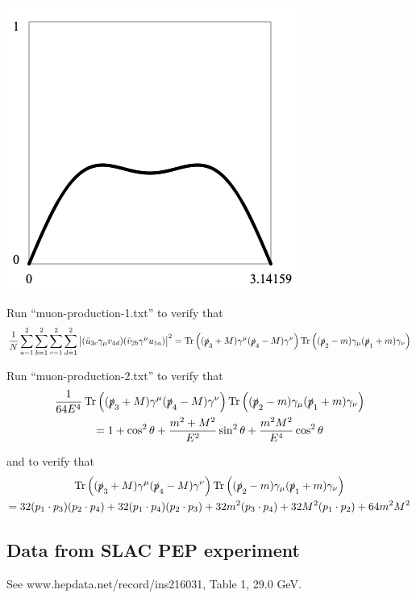 \documentclass[12pt]{article}
\begin{document}
\begin{center}
\includegraphics[scale=0.5]{muon-production.png}
\end{center}

\noindent
Run ``muon-production-1.txt'' to verify that
$$
\frac{1}{N}\sum_{a=1}^2\sum_{b=1}^2\sum_{c=1}^2\sum_{d=1}^2
\big|(\bar{u}_{3c}\gamma_\mu v_{4d})(\bar{v}_{2b}\gamma^\mu u_{1a})\big|^2
=
\mathop{\rm Tr}\left((\slashed{p}_3+M)\gamma^\mu(\slashed{p}_4-M)\gamma^\nu\right)
\mathop{\rm Tr}\left((\slashed{p}_2-m)\gamma_\mu(\slashed{p}_1+m)\gamma_\nu\right)
$$

\bigskip
\noindent
Run ``muon-production-2.txt'' to verify that
\begin{multline*}
\frac{1}{64E^4}
\mathop{\rm Tr}\left((\slashed{p}_3+M)\gamma^\mu(\slashed{p}_4-M)\gamma^\nu\right)
\mathop{\rm Tr}\left((\slashed{p}_2-m)\gamma_\mu(\slashed{p}_1+m)\gamma_\nu\right)
\\
=1+\cos^2\theta+\frac{m^2+M^2}{E^2}\sin^2\theta+\frac{m^2M^2}{E^4}\cos^2\theta
\end{multline*}

\noindent
and to verify that
\begin{multline*}
\mathop{\rm Tr}\left((\slashed{p}_3+M)\gamma^\mu(\slashed{p}_4-M)\gamma^\nu\right)
\mathop{\rm Tr}\left((\slashed{p}_2-m)\gamma_\mu(\slashed{p}_1+m)\gamma_\nu\right)
\\=
32 (p_1\cdot p_3) (p_2\cdot p_4) +
32 (p_1\cdot p_4) (p_2\cdot p_3) +
32 m^2 (p_3\cdot p_4) +
32 M^2 (p_1\cdot p_2) +
64 m^2 M^2
\end{multline*}

\subsection*{Data from SLAC PEP experiment}
See www.hepdata.net/record/ins216031, Table 1, 29.0 GeV.
\end{document}
